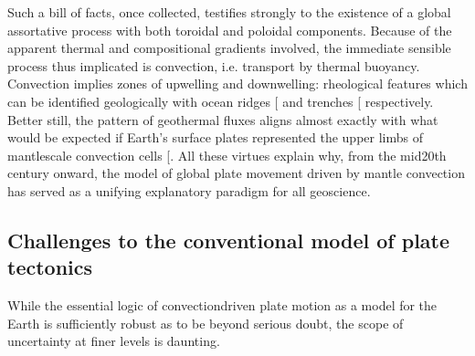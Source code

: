 \documentclass[letterpaper,10pt,english]{jupyterBook}
\begin{document}
\sphinxAtStartPar
Such a bill of facts, once collected, testifies strongly to the existence of a global assortative process with both toroidal and poloidal components. Because of the apparent thermal and compositional gradients involved, the immediate sensible process thus implicated is convection, i.e. transport by thermal buoyancy. Convection implies zones of upwelling and downwelling: rheological features which can be identified geologically with ocean ridges {[}\sphinxcite{references:id278}{]} and trenches {[}\sphinxcite{references:id277}{]} respectively. Better still, the pattern of geothermal fluxes aligns almost exactly with what would be expected if Earth’s surface plates represented the upper limbs of mantle\sphinxhyphen{}scale convection cells {[}\sphinxcite{references:id276}{]}. All these virtues explain why, from the mid\sphinxhyphen{}20th century onward, the model of global plate movement driven by mantle convection has served as a unifying explanatory paradigm for all geoscience.


\subsection{Challenges to the conventional model of plate tectonics}
\label{\detokenize{content/chapter_01_background/main:challenges-to-the-conventional-model-of-plate-tectonics}}
\sphinxAtStartPar
While the essential logic of convection\sphinxhyphen{}driven plate motion as a model for the Earth is sufficiently robust as to be beyond serious doubt, the scope of uncertainty at finer levels is daunting.
\end{document}
